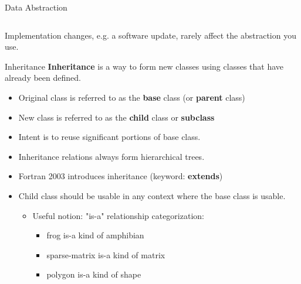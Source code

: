 \documentclass[11pt]{beamer}
\begin{document}
\begin{frame}{Data Abstraction}
\begin{columns}
\begin{column}{0.7\textwidth}
  \end{column}
\end{columns}
Implementation changes, e.g. a software update, rarely affect the abstraction you use.
\end{frame}


\begin{frame}{Inheritance}
\textbf{Inheritance} is a way to form new classes using classes that have already been defined.
\begin{itemize}

  \item Original class is referred to as the \textbf{base} class (or \textbf{parent} class)
  \item New class is referred to as the \textbf{child} class or \textbf{subclass}
  \item Intent is to reuse significant portions of base class.
  \item Inheritance relations always form hierarchical trees.
  \item Fortran 2003 introduces inheritance (keyword: \textbf{extends})
  \item Child class should be usable in any context where the base class is usable.
  \begin{itemize}
  \item Useful notion: "is-a" relationship categorization:
    \begin{itemize}
    \item frog is-a kind of amphibian
    \item sparse-matrix is-a kind of matrix
    \item polygon is-a kind of shape
    \end{itemize}
  \end{itemize}
  
 \end{itemize}

\end{frame}


\end{document}

